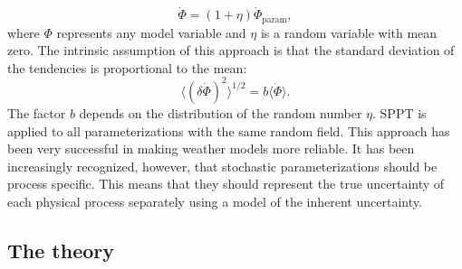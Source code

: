 \documentclass[a4paper, 12pt]{article}
\begin{document}
\begin{equation} \label{eq:SPPT}
 \dot{\Phi} = (1 + \eta) \dot{\Phi}_{\mathrm{param}},
\end{equation}
where $\Phi$ represents any model variable and $\eta$ is a random variable with mean zero. The intrinsic assumption of this approach is that the standard deviation of the tendencies is proportional to the mean:
\begin{equation} \label{eq:SPPT_std}
 \langle (\delta \dot{\Phi})^2 \rangle^{1/2} = b \langle \dot{\Phi} \rangle.
\end{equation}
The factor $b$ depends on the distribution of the random number $\eta$. SPPT is applied to all parameterizations with the same random field. This approach has been very successful in making weather models more reliable. It has been increasingly recognized, however, that stochastic parameterizations should be process specific. This means that they should represent the true uncertainty of each physical process separately using a model of the inherent uncertainty. 

\subsection{The \cite{Craig2006} theory}
\end{document}

